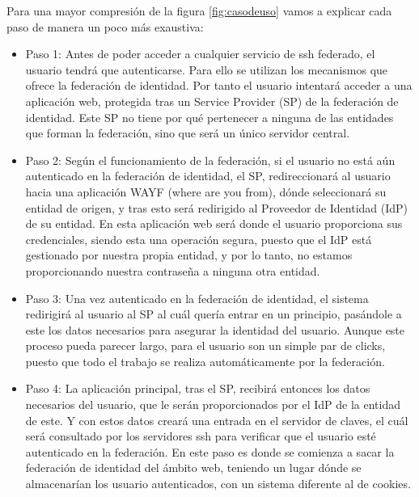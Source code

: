    Para una mayor compresión de la figura \ref{fig:casodeuso} vamos a
    explicar cada paso de manera un poco más exaustiva:

    \begin{itemize}
        
        \item{Paso 1:} Antes de poder acceder a cualquier servicio de
        ssh federado, el usuario tendrá que autenticarse. Para ello se
        utilizan los mecanismos que ofrece la federación de identidad.
        Por tanto el usuario intentará acceder a una aplicación web,
        protegida tras un Service Provider (SP) de la federación de
        identidad.
        Este SP no tiene por qué pertenecer a ninguna de las entidades
        que forman la federación, sino que será un único servidor
        central.

        \item{Paso 2:} Según el funcionamiento de la federación, si el
        usuario no está aún autenticado en la federación de identidad,
        el SP, redireccionará al usuario hacia una aplicación WAYF
        (where are you from), dónde seleccionará su entidad de origen,
        y tras esto será redirigido al Proveedor de Identidad (IdP) de
        su entidad. En esta aplicación web será donde el usuario
        proporciona sus credenciales, siendo esta una operación
        segura, puesto que el IdP está gestionado por nuestra propia
        entidad, y por lo tanto, no estamos proporcionando nuestra
        contraseña a ninguna otra entidad.

        \item{Paso 3:} Una vez autenticado en la federación de
        identidad, el sistema redirigirá al usuario al SP al cuál
        quería entrar en un principio, pasándole a este los datos
        necesarios para asegurar la identidad del usuario.
        Aunque este proceso pueda parecer largo, para el usuario son
        un simple par de clicks, puesto que todo el trabajo se realiza
        automáticamente por la federación.

        \item{Paso 4:} La aplicación principal, tras el SP, recibirá
        entonces los datos necesarios del usuario, que le serán
        proporcionados por el IdP de la entidad de este. Y con estos
        datos creará una entrada en el servidor de claves, el cuál
        será consultado por los servidores ssh para verificar que el
        usuario esté autenticado en la federación.
        En este paso es donde se comienza a sacar la federación de
        identidad del ámbito web, teniendo un lugar dónde se
        almacenarían los usuario autenticados, con un sistema
        diferente al de cookies.


\end{itemize}
